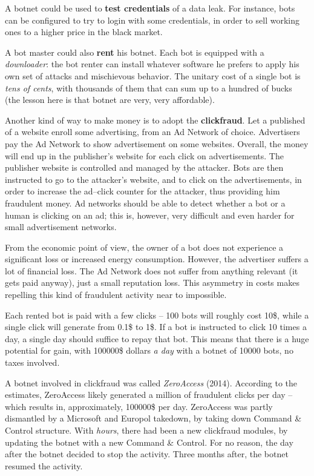 \documentclass[10pt]{extbook}
\begin{document}
A botnet could be used to \textbf{test credentials} of a data leak. For instance,
bots can be configured to try to login with some credentials, in order to sell
working ones to a higher price in the black market.

A bot master could also \textbf{rent} his botnet. Each bot is equipped with a
\emph{downloader}: the bot renter can install whatever software he prefers to
apply his own set of attacks and mischievous behavior. The unitary cost of a
single bot is \emph{tens of cents}, with thousands of them that can sum up to a
hundred of bucks (the lesson here is that botnet are very, very affordable).

Another kind of way to make money is to adopt the \textbf{clickfraud}. Let a
published of a website enroll some advertising, from an Ad Network of choice.
Advertisers pay the Ad Network to show advertisement on some websites. Overall,
the money will end up in the publisher's website for each click on
advertisements. The publisher website is controlled and managed by the
attacker. Bots are then instructed to go to the attacker's website, and to
click on the advertisements, in order to increase the ad--click counter for the
attacker, thus providing him fraudulent money. Ad networks should be able to
detect whether a bot or a human is clicking on an ad; this is, however, very
difficult and even harder for small advertisement networks.

From the economic point of view, the owner of a bot does not experience a
significant loss or increased energy consumption. However, the advertiser
suffers a lot of financial loss. The Ad Network does not suffer from anything
relevant (it gets paid anyway), just a small reputation loss. This asymmetry in
costs makes repelling this kind of fraudulent activity near to impossible.

Each rented bot is paid with a few clicks -- 100 bots will roughly cost 10\$,
while a single click will generate from 0.1\$ to 1\$. If a bot is instructed to
click 10 times a day, a single day should suffice to repay that bot. This means
that there is a huge potential for gain, with 100000\$ dollars \emph{a day}
with a botnet of 10000 bots, no taxes involved.

A botnet involved in clickfraud was called \emph{ZeroAccess} (2014). According
to the estimates, ZeroAccess likely generated a million of fraudulent clicks
per day -- which results in, approximately, 100000\$ per day. ZeroAccess was
partly dismantled by a Microsoft and Europol takedown, by taking down Command
\& Control structure. With \emph{hours}, there had been a new clickfraud
modules, by updating the botnet with a new Command \& Control. For no reason,
the day after the botnet decided to stop the activity. Three months after, the
botnet resumed the activity.
\end{document}
